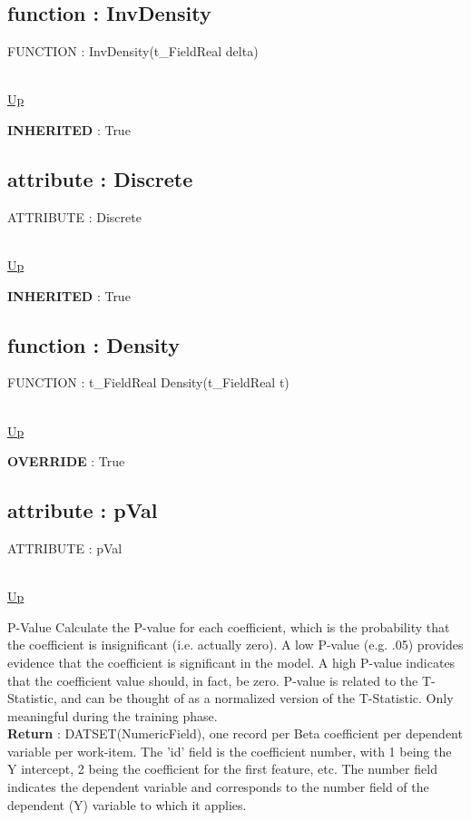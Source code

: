 \subsection*{function : InvDensity}
\hypertarget{ecldoc:linearregression.ols.distributionbase.invdensity}{FUNCTION : InvDensity(t\_FieldReal delta)} \\
\hyperlink{ecldoc:linearregression.ols.normaldistribution}{Up} \\
\par
\textbf{INHERITED} : True \\
\subsection*{attribute : Discrete}
\hypertarget{ecldoc:linearregression.ols.distributionbase.discrete}{ATTRIBUTE : Discrete} \\
\hyperlink{ecldoc:linearregression.ols.normaldistribution}{Up} \\
\par
\textbf{INHERITED} : True \\
\subsection*{function : Density}
\hypertarget{ecldoc:linearregression.ols.normaldistribution.density}{FUNCTION : t\_FieldReal Density(t\_FieldReal t)} \\
\hyperlink{ecldoc:linearregression.ols.normaldistribution}{Up} \\
\par
\textbf{OVERRIDE} : True \\

\subsection*{attribute : pVal}
\hypertarget{ecldoc:linearregression.ols.pval}{ATTRIBUTE : pVal} \\
\hyperlink{ecldoc:linearregression.ols}{Up} \\
\par
P-Value Calculate the P-value for each coefficient, which is the probability that the coefficient is insignificant (i.e. actually zero). A low P-value (e.g. .05) provides evidence that the coefficient is significant in the model. A high P-value indicates that the coefficient value should, in fact, be zero. P-value is related to the T-Statistic, and can be thought of as a normalized version of the T-Statistic. Only meaningful during the training phase. \\
\textbf{Return} : DATSET(NumericField), one record per Beta coefficient per dependent variable per work-item. The 'id' field is the coefficient number, with 1 being the Y intercept, 2 being the coefficient for the first feature, etc. The number field indicates the dependent variable and corresponds to the number field of the dependent (Y) variable to which it applies. \\
